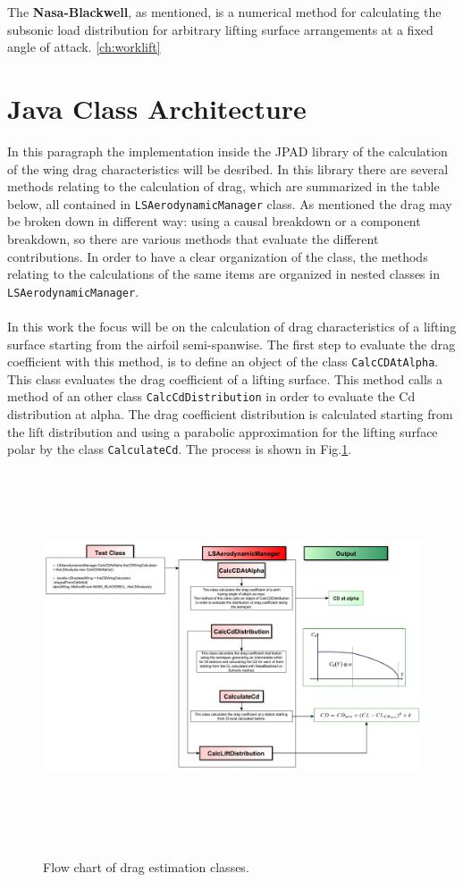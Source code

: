 The {\bfseries Nasa-Blackwell}, as mentioned, is a numerical method for calculating the subsonic load distribution for arbitrary lifting surface arrangements at a fixed angle of attack. \ref{ch:worklift}


\section{Java Class Architecture}

In this paragraph the implementation inside the JPAD library of the calculation of the wing drag characteristics will be desribed. In this library there are several methods relating to the calculation of drag, which are summarized in the table below, all contained in \texttt{LSAerodynamicManager} class. As mentioned the drag may be broken down in different way: using a causal breakdown or a component breakdown, so there are various methods that evaluate the different contributions. In order to have a clear organization of the class, the methods relating to the calculations of the same items are organized in nested classes in  \texttt{LSAerodynamicManager}.\\ \\

In this work the focus will be on the calculation of drag characteristics of a lifting surface starting from the airfoil semi-spanwise. The first step to evaluate the drag coefficient with this method, is to define an object of the class  \texttt{CalcCDAtAlpha}. This class evaluates the drag coefficient of a lifting surface. This method calls  a method of an other class \texttt{CalcCdDistribution} in order to evaluate the Cd distribution at alpha. The drag coefficient distribution is calculated starting from the lift distribution and using a parabolic approximation for the lifting surface polar by the class \texttt{CalculateCd}. The process is shown in Fig.\ref{fig:cd}.


\begin{figure}
\centering
{\includegraphics[height=11cm, angle=90]{immagini/dragflowchart.pdf}}
\caption{Flow chart of drag estimation classes.}
\label{fig:cd}
\end{figure}

